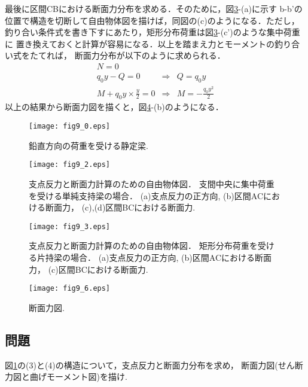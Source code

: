 \documentclass[10pt,a4j]{jbook}
\begin{document}
\begin{enumerate}
最後に区間CBにおける断面力分布を求める．そのために，図\ref{fig:fig9_3}-(a)に示す
b-b'の位置で構造を切断して自由物体図を描けば，同図の(c)のようになる．ただし，
釣り合い条件式を書き下すにあたり，矩形分布荷重は図\ref{fig:fig9_3}-(c')のような集中荷重に
置き換えておくと計算が容易になる．以上を踏まえ力とモーメントの釣り合い式をたてれば，
断面力分布が以下のように求められる．
\begin{eqnarray}
	N=0 & & 
	\label{eqn:}
	\\
	q_0y -Q=0 & \Rightarrow & Q=q_0y 
	\label{eqn:}
	\\
	M+q_0y\times \frac{y}{2} =0 & \Rightarrow & M=-\frac{q_0y^2}{2}
	\label{eqn:}
\end{eqnarray}
以上の結果から断面力図を描くと，図\ref{fig:fig9_6}-(b)のようになる．
\end{enumerate}
\begin{figure}
	\begin{center}
	\texttt{[image: fig9\_0.eps]} 
	\end{center}
	\caption{
		鉛直方向の荷重を受ける静定梁.
	} 
	\label{fig:fig9_0}
\end{figure}
\begin{figure}
	\begin{center}
	\texttt{[image: fig9\_2.eps]} 
	\end{center}
	\caption{
		支点反力と断面力計算のための自由物体図．
		支間中央に集中荷重を受ける単純支持梁の場合．
		(a)支点反力の正方向, (b)区間ACにおける断面力，
		(c),(d)区間BCにおける断面力. 
	} 
	\label{fig:fig9_2}
\end{figure}
\begin{figure}
	\begin{center}
	\texttt{[image: fig9\_3.eps]} 
	\end{center}
	\caption{
		支点反力と断面力計算のための自由物体図．
		矩形分布荷重を受ける片持梁の場合．
		(a)支点反力の正方向, (b)区間ACにおける断面力，
		(c)区間BCにおける断面力. 
	} 
	\label{fig:fig9_3}
\end{figure}
\begin{figure}
	\begin{center}
	\texttt{[image: fig9\_6.eps]} 
	\end{center}
	\caption{
		断面力図. 
	} 
	\label{fig:fig9_6}
\end{figure}
\subsection{問題}
図\ref{fig:fig9_0}の(3)と(4)の構造について，支点反力と断面力分布を求め，
断面力図(せん断力図と曲げモーメント図)を描け. 
\end{document}
